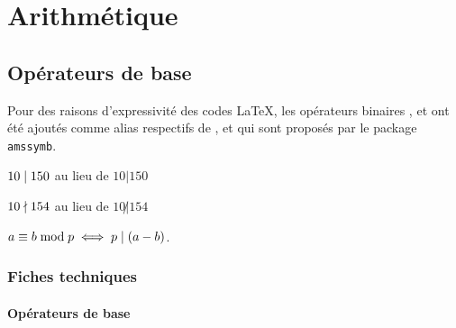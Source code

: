 \documentclass[12pt,a4paper]{article}
\begin{document}
\section{Arithmétique}

\subsection{Opérateurs de base}

Pour des raisons d'expressivité des codes \LaTeX{}, les opérateurs binaires ,  et  ont été ajoutés comme alias respectifs de ,  et  qui sont proposés par le package \verb+amssymb+.

\begin{latexex}
$10 \mid 150$ au lieu de
$10 | 150$

$10 \nmid 154$ au lieu de
$10 \not| 154$

$a \equiv b \bmod p
 \iff
 p \mid (a - b)$.
\end{latexex}




\subsubsection{Fiches techniques}

\paragraph{Opérateurs de base}



\extraspace

\end{document}
